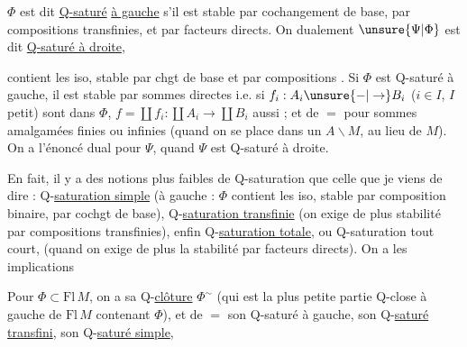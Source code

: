 $\Phi$ est dit \uline{Q-saturé} \uline{à gauche} s'il
 est stable par cochangement de base,
par  compositions transfinies, et par facteurs
directs. On  dualement  \deleted{$\unsure{\Phi}$}$\unsure{\Psi|\Phi}$ est dit
\uline{Q-saturé à droite},

contient les iso, stable par chgt de base et par compositions
. Si $\Phi$ est Q-saturé à gauche, il est stable par
 sommes directes i.e. si 
$f_i:A_i\unsure{-|\to}B_i$ ($i\in I$, $I$ petit) sont dans $\Phi$,
$f=\coprod f_i:\coprod A_i\longrightarrow\coprod B_i$ aussi ;
et de $=$ pour  sommes amalgamées finies ou
infinies (quand on se place dans un $A\backslash M$, au lieu de $M$).
On a l'énoncé dual pour $\Psi$, quand $\Psi$ est Q-saturé à droite.

En fait, il y a des notions plus faibles de Q-saturation que celle
que je viens de dire : Q-\uline{saturation simple} (à gauche :
$\Phi$ contient les iso, stable par composition binaire, par
cochgt de base), Q-\uline{saturation transfinie} (on exige de plus
stabilité par compositions transfinies), enfin Q-\uline{saturation
totale}, ou Q-saturation tout court\unsure{\S|)}, (quand on exige de
plus la stabilité par facteurs directs). On a les implications

 Pour $\Phi\subset\mathrm{Fl}\,M$, on a sa
Q-\uline{clôture}  $\Phi^{\sim}$
(qui est la plus petite partie Q-close à gauche de
$\mathrm{Fl}\,M$ contenant $\Phi$), et de $=$ son Q-saturé
 à gauche, son Q-\uline{saturé transfini}, son
Q-\uline{saturé simple},

